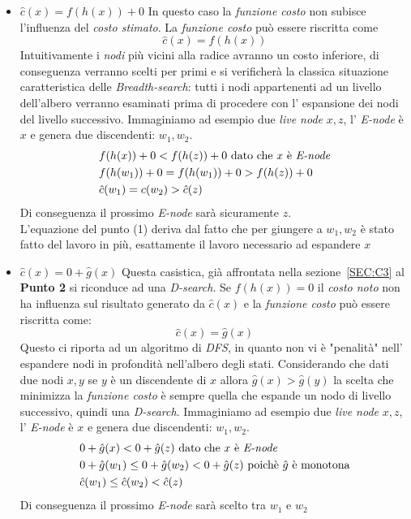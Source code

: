 \documentclass[a4paper]{article}
\begin{document}
\begin{itemize}
	\item $\hat c(x) = f(h(x)) + 0$ In questo caso la \textit{funzione costo} non subisce l'influenza del \textit{costo stimato}.
		La \textit{funzione costo} può essere riscritta come $$\hat c(x) = f(h(x))$$
		Intuitivamente i \textit{nodi} più vicini alla radice avranno un costo inferiore, di conseguenza verranno scelti per primi e si verificherà la classica situazione caratteristica delle \textit{Breadth-search}: tutti i nodi appartenenti ad un livello dell'albero verranno esaminati prima di procedere con l' espansione dei nodi del livello successivo.
Immaginiamo ad esempio due \textit{live node} $x,z$, l' \textit{E-node} è $x$ e genera due discendenti: $w_1, w_2$.
                \begin{align}
                        &f(h(x)) + 0 < f(h(z)) + 0 \text{ dato che $x$ è \textit{E-node}} \notag \\
                        &f(h(w_1)) + 0 = f(h(w_1)) + 0 > f(h(z)) + 0 \\
                        &\hat c(w_1) = c(w_2) > \hat c(z) \notag
                \end{align}
Di conseguenza il prossimo \textit{E-node} sarà sicuramente $z$.\\
L'equazione del punto (1) deriva dal fatto che per giungere a $w_1,w_2$ è stato fatto del lavoro in più, esattamente il lavoro necessario ad espandere $x$

	\item $\hat c(x) = 0 + \hat g(x)$ Questa casistica, già affrontata nella sezione~\ref{SEC:C3} al \textbf{Punto 2} si riconduce ad una \textit{D-search}.
		Se $f(h(x)) =0$ il \textit{costo noto} non ha influenza sul risultato generato da $\hat c(x)$ e la \textit{funzione costo} può essere riscritta come: $$\hat c(x) = \hat g(x)$$
Questo ci riporta ad un algoritmo di \textit{DFS}, in quanto non vi è "penalità" nell' espandere nodi in profondità nell'albero degli stati.
Considerando che dati due nodi $x,y$ se $y$ è un discendente di $x$ allora $\hat g(x) > \hat g(y)$ la scelta che minimizza la \textit{funzione costo} è sempre quella che espande un nodo di livello successivo, quindi una \textit{D-search}.
Immaginiamo ad esempio due \textit{live node} $x,z$, l' \textit{E-node} è $x$ e genera due discendenti: $w_1, w_2$.
                \begin{align}
                        &0 + \hat g(x) < 0 + \hat g(z) \text{ dato che $x$ è \textit{E-node}} \notag \\
                        &0 + \hat g(w_1) \leq 0 + \hat g(w_2) < 0 + \hat g(z) \text{ poichè $\hat g$ è monotona} \notag\\
                        &\hat c(w_1) \leq \hat c(w_2) < \hat c(z) \notag
                \end{align}
Di conseguenza il prossimo \textit{E-node} sarà scelto tra $w_1$ e $w_2$

\end{itemize}
\end{document}
